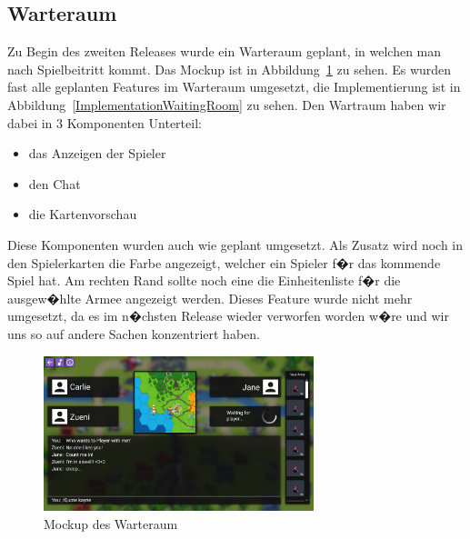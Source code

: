 \documentclass[12pt, titlepage]{scrartcl}
\newcommand{\Abb}[1]{%
	Abbildung\ \ref{#1}%
}
\begin{document}
			\subsection{Warteraum}
			Zu Begin des zweiten Releases wurde ein Warteraum geplant, in welchen man nach Spielbeitritt kommt. Das Mockup ist in \Abb{MockupWaitingRoom} zu sehen. Es wurden fast alle geplanten Features im Warteraum umgesetzt, die Implementierung ist in \Abb{ImplementationWaitingRoom} zu sehen. Den Wartraum haben wir dabei in 3 Komponenten Unterteil:
			\begin{itemize}
				\item das Anzeigen der Spieler
				\item den Chat
				\item die Kartenvorschau
			\end{itemize}
			Diese Komponenten wurden auch wie geplant umgesetzt. Als Zusatz wird noch in den Spielerkarten die Farbe angezeigt, welcher ein Spieler f�r das kommende Spiel hat. Am rechten Rand sollte noch eine die Einheitenliste f�r die ausgew�hlte Armee angezeigt werden. Dieses Feature wurde nicht mehr umgesetzt, da es im n�chsten Release wieder verworfen worden w�re und wir uns so auf andere Sachen konzentriert haben.
			\begin{figure}[H] 
				\centering
				\includegraphics[width=0.7\textwidth]{Waiting_Room_Game_mit_ArmyView.png}
				\caption{Mockup des Warteraum}
				\label{MockupWaitingRoom}
			\end{figure}
			
\end{document}
